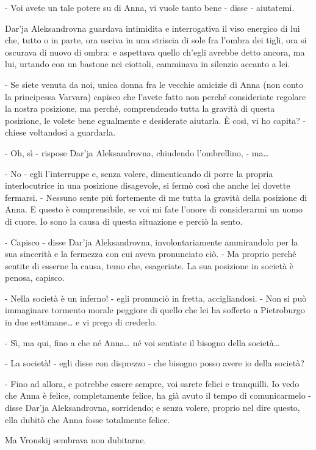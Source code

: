 - Voi avete un tale potere su di Anna, vi vuole tanto bene - disse - aiutatemi. 

Dar'ja Aleksandrovna guardava intimidita e interrogativa il viso energico di lui che, tutto o in parte, ora usciva in una striscia di sole fra l'ombra dei tigli, ora si oscurava di nuovo di ombra: e aspettava quello ch'egli avrebbe detto ancora, ma lui, urtando con un bastone nei ciottoli, camminava in silenzio accanto a lei. 

- Se siete venuta da noi, unica donna fra le vecchie amicizie di Anna (non conto la principessa Varvara) capisco che l'avete fatto non perché consideriate regolare la nostra posizione, ma perché, comprendendo tutta la gravità di questa posizione, le volete bene egualmente e desiderate aiutarla. È così, vi ho capita? - chiese voltandosi a guardarla. 

- Oh, sì - rispose Dar'ja Aleksandrovna, chiudendo l'ombrellino, - ma\ldots{} 

- No - egli l'interruppe e, senza volere, dimenticando di porre la propria interlocutrice in una posizione disagevole, si fermò così che anche lei dovette fermarsi. - Nessuno sente più fortemente di me tutta la gravità della posizione di Anna. E questo è comprensibile, se voi mi fate l'onore di considerarmi un uomo di cuore. Io sono la causa di questa situazione e perciò la sento. 

- Capisco - disse Dar'ja Aleksandrovna, involontariamente ammirandolo per la sua sincerità e la fermezza con cui aveva pronunciato ciò. - Ma proprio perché sentite di esserne la causa, temo che, esageriate. La sua posizione in società è penosa, capisco. 

- Nella società è un inferno! - egli pronunciò in fretta, accigliandosi. - Non si può immaginare tormento morale peggiore di quello che lei ha sofferto a Pietroburgo in due settimane\ldots{} e vi prego di crederlo. 

- Sì, ma qui, fino a che né Anna\ldots{} né voi sentiate il bisogno della società\ldots{} 

- La società! - egli disse con disprezzo - che bisogno posso avere io della società? 

- Fino ad allora, e potrebbe essere sempre, voi sarete felici e tranquilli. Io vedo che Anna è felice, completamente felice, ha già avuto il tempo di comunicarmelo - disse Dar'ja Aleksandrovna, sorridendo; e senza volere, proprio nel dire questo, ella dubitò che Anna fosse totalmente felice. 

Ma Vronskij sembrava non dubitarne. 

